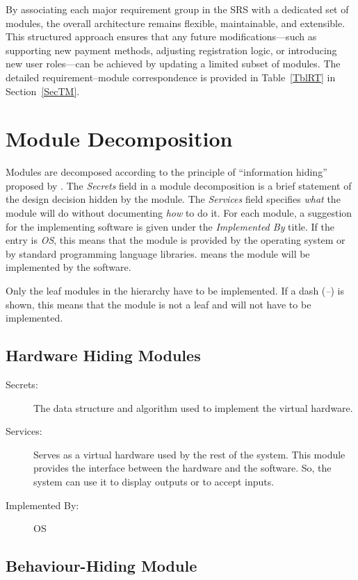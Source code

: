 \documentclass[12pt, titlepage]{article}
\newcommand{\mref}[1]{M\ref{#1}}
\begin{document}
\noindent
By associating each major requirement group in the SRS with a dedicated set of modules,
the overall architecture remains flexible, maintainable, and extensible. This structured
approach ensures that any future modifications—such as supporting new payment methods,
adjusting registration logic, or introducing new user roles—can be achieved by updating a
limited subset of modules. The detailed requirement–module correspondence is provided in
Table~\ref{TblRT} in Section~\ref{SecTM}.

\section{Module Decomposition} \label{SecMD}

Modules are decomposed according to the principle of ``information hiding''
proposed by \citet{ParnasEtAl1984}. The \emph{Secrets} field in a module
decomposition is a brief statement of the design decision hidden by the
module. The \emph{Services} field specifies \emph{what} the module will do
without documenting \emph{how} to do it. For each module, a suggestion for the
implementing software is given under the \emph{Implemented By} title. If the
entry is \emph{OS}, this means that the module is provided by the operating
system or by standard programming language libraries.  \emph{\progname{}} means the
module will be implemented by the \progname{} software.

Only the leaf modules in the hierarchy have to be implemented. If a dash
(\emph{--}) is shown, this means that the module is not a leaf and will not have
to be implemented.

\subsection{Hardware Hiding Modules} %

\begin{description}
\item[Secrets:]The data structure and algorithm used to implement the virtual
  hardware.
\item[Services:]Serves as a virtual hardware used by the rest of the
  system. This module provides the interface between the hardware and the
  software. So, the system can use it to display outputs or to accept inputs.
\item[Implemented By:] OS
\end{description}

\subsection{Behaviour-Hiding Module}
\end{document}
